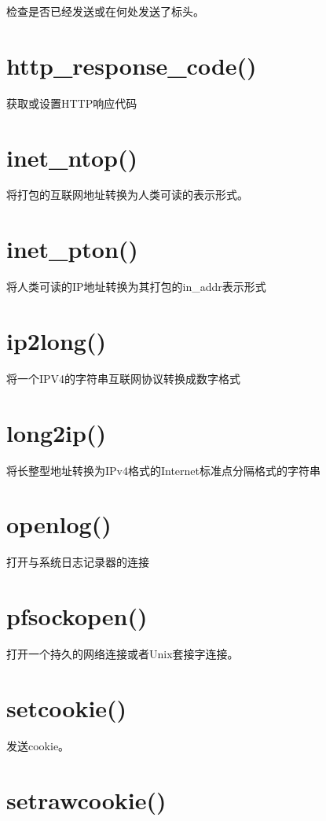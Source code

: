 检查是否已经发送或在何处发送了标头。

\section{http\_response\_code()}

获取或设置HTTP响应代码

\section{inet\_ntop()}

将打包的互联网地址转换为人类可读的表示形式。

\section{inet\_pton()}

将人类可读的IP地址转换为其打包的in\_addr表示形式


\section{ip2long()}

将一个IPV4的字符串互联网协议转换成数字格式

\section{long2ip()}

将长整型地址转换为IPv4格式的Internet标准点分隔格式的字符串

\section{openlog()}

打开与系统日志记录器的连接

\section{pfsockopen()}

打开一个持久的网络连接或者Unix套接字连接。

\section{setcookie()}

发送cookie。

\section{setrawcookie()}


